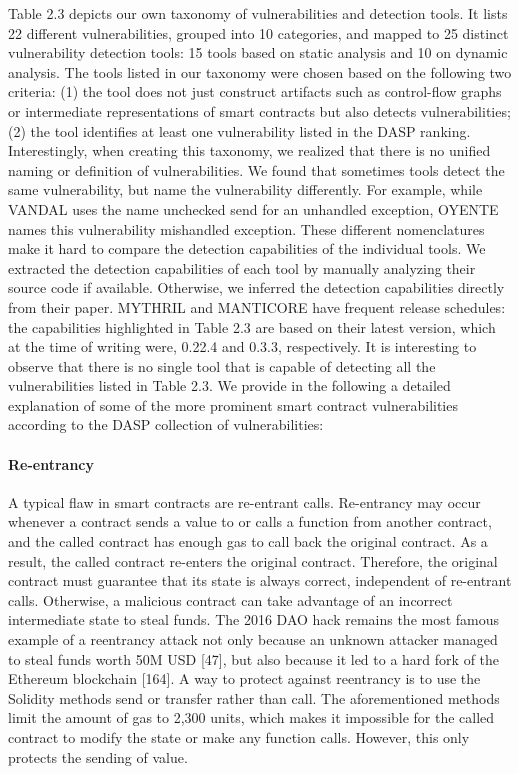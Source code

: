         Table 2.3 depicts our own taxonomy of vulnerabilities and detection tools.
        It lists 22 different vulnerabilities, grouped into 10 categories, and mapped to 25 distinct vulnerability detection tools: 15 tools based on static analysis and 10 on dynamic analysis.
        The tools listed in our taxonomy were chosen based on the following two criteria: (1) the tool does not just construct artifacts such as control-flow graphs or intermediate representations of smart contracts but also detects vulnerabilities;
        (2) the tool identifies at least one vulnerability listed in the DASP ranking.
        Interestingly, when creating this taxonomy, we realized that there is no unified naming or definition of vulnerabilities.
        We found that sometimes tools detect the same vulnerability, but name the vulnerability differently.
        For example, while VANDAL uses the name unchecked send for an unhandled exception, OYENTE names this vulnerability mishandled exception.
        These different nomenclatures make it hard to compare the detection capabilities of the individual tools.
        We extracted the detection capabilities of each tool by manually analyzing their source code if available.
        Otherwise, we inferred the detection capabilities directly from their paper.
        MYTHRIL and MANTICORE have frequent release schedules: the capabilities highlighted in Table 2.3 are based on their latest version, which at the time of writing were, 0.22.4 and 0.3.3, respectively.
        It is interesting to observe that there is no single tool that is capable of detecting all the vulnerabilities listed in Table 2.3.
        We provide in the following a detailed explanation of some of the more prominent smart contract vulnerabilities according to the DASP collection of vulnerabilities:

        \paragraph{Re-entrancy}
            A typical flaw in smart contracts are re-entrant calls.
            Re-entrancy may occur whenever a contract sends a value to or calls a function from another contract, and the called contract has enough gas to call back the original contract.
            As a result, the called contract re-enters the original contract.
            Therefore, the original contract must guarantee that its state is always correct, independent of re-entrant calls.
            Otherwise, a malicious contract can take advantage of an incorrect intermediate state to steal funds.
            The 2016 DAO hack remains the most famous example of a reentrancy attack not only because an unknown attacker managed to steal funds worth 50M USD [47], but also because it led to a hard fork of the Ethereum blockchain [164].
            A way to protect against reentrancy is to use the Solidity methods send or transfer rather than call.
            The aforementioned methods limit the amount of gas to 2,300 units, which makes it impossible for the called contract to modify the state or make any function calls.
            However, this only protects the sending of value.
